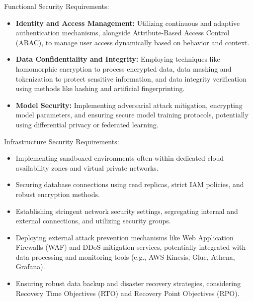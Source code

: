 Functional Security Requirements:
\begin{itemize}
    \item \textbf{Identity and Access Management:} Utilizing continuous and adaptive authentication mechanisms, alongside Attribute-Based Access Control (ABAC), to manage user access dynamically based on behavior and context\cite{haryanto_secgenai_2024}.
    \item \textbf{Data Confidentiality and Integrity:} Employing techniques like homomorphic encryption to process encrypted data, data masking and tokenization to protect sensitive information, and data integrity verification using methods like hashing and artificial fingerprinting\cite{haryanto_secgenai_2024}.
    \item \textbf{Model Security:} Implementing adversarial attack mitigation, encrypting model parameters, and ensuring secure model training protocols, potentially using differential privacy or federated learning\cite{haryanto_secgenai_2024}.
\end{itemize}

Infrastructure Security Requirements:
\begin{itemize}
    \item Implementing sandboxed environments often within dedicated cloud availability zones and virtual private networks\cite{haryanto_secgenai_2024}.
    \item Securing database connections using read replicas, strict IAM policies, and robust encryption methods\cite{haryanto_secgenai_2024}.
    \item Establishing stringent network security settings, segregating internal and external connections, and utilizing security groups\cite{haryanto_secgenai_2024}.
    \item Deploying external attack prevention mechanisms like Web Application Firewalls (WAF) and DDoS mitigation services, potentially integrated with data processing and monitoring tools (e.g., AWS Kinesis, Glue, Athena, Grafana)\cite{haryanto_secgenai_2024}.
    \item Ensuring robust data backup and disaster recovery strategies, considering Recovery Time Objectives (RTO) and Recovery Point Objectives (RPO)\cite{haryanto_secgenai_2024}.
\end{itemize}

